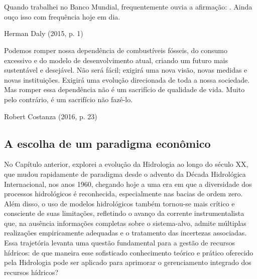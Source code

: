 \documentclass[./main.tex]{subfiles}
\begin{document}
\chapter{\chapEco} \label{chap:ecoeco}

\setlength{\parskip}{0mm}

\epigraph{\small{Quando trabalhei no Banco Mundial, frequentemente ouvia a afirmação: . Ainda ouço isso com frequência hoje em dia.}}{Herman Daly (2015, p. 1) \cite{Daly2015a}}

\epigraph{\small{Podemos romper nossa dependência de combustíveis fósseis, do consumo excessivo e do modelo de desenvolvimento atual, criando um futuro mais sustentável e desejável. Não será fácil; exigirá uma nova visão, novas medidas e novas instituições. Exigirá uma evolução direcionada de toda a nossa sociedade. Mas romper essa dependência não é um sacrifício de qualidade de vida. Muito pelo contrário, é um sacrifício não fazê-lo.}}{Robert Costanza (2016, p. 23) \cite{potschin2016}}

\setlength{\parskip}{\myparskip}

\section{A escolha de um paradigma econômico} \label{chap:ecoeco:sec1}

\par No Capítulo anterior, explorei a evolução da Hidrologia ao longo do século XX, que mudou rapidamente de paradigma desde o advento da Década Hidrológica Internacional, nos anos 1960, chegando hoje a uma era em que a diversidade dos processos hidrológicos é reconhecida, especialmente nas bacias de ordem zero. Além disso, o uso de modelos hidrológicos também tornou-se mais crítico e consciente de suas limitações, refletindo o avanço da corrente instrumentalista que, na ausência informações completas sobre o sistema-alvo, admite múltiplas realizações empiricamente adequadas e o tratamento das incertezas associadas. Essa trajetória levanta uma questão fundamental para a gestão de recursos hídricos: de que maneira esse sofisticado conhecimento teórico e prático oferecido pela Hidrologia pode ser aplicado para aprimorar o gerenciamento integrado dos recursos hídricos?
\end{document}
